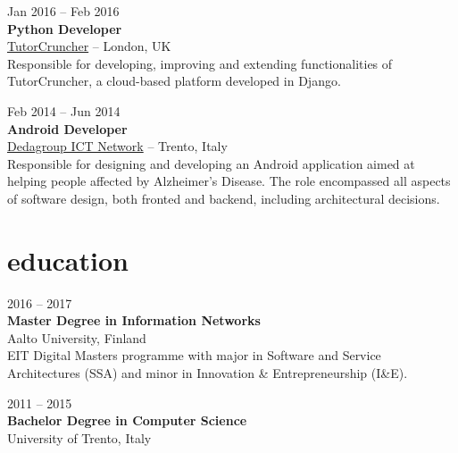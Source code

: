\documentclass[]{friggeri-cv}
\begin{document}
{Jan 2016 -- Feb 2016} \\
{\textbf{Python Developer}} \\
{\href{http://www.tutorcruncher.com}{TutorCruncher}} -- {London, UK} \\
{Responsible for developing, improving and extending functionalities of TutorCruncher, a cloud-based platform developed in Django.}

{Feb 2014 -- Jun 2014} \\
{\textbf{Android Developer}} \\
{\href{http://www.dedagroup.it}{Dedagroup ICT Network}} -- {Trento, Italy} \\
{Responsible for designing and developing an Android application aimed at helping people affected by Alzheimer's Disease. The role encompassed all aspects of software design, both fronted and backend, including architectural decisions.}





\section{education}

{2016 -- 2017} \\
\textbf{Master Degree {\normalfont in Information Networks}} \\
{Aalto University, Finland} \\
{EIT Digital Masters programme with major in Software and Service Architectures (SSA) and minor in Innovation \& Entrepreneurship (I\&E).}

{2011 -- 2015} \\
\textbf{Bachelor Degree {\normalfont in Computer Science}} \\
{University of Trento, Italy}
\end{document}

